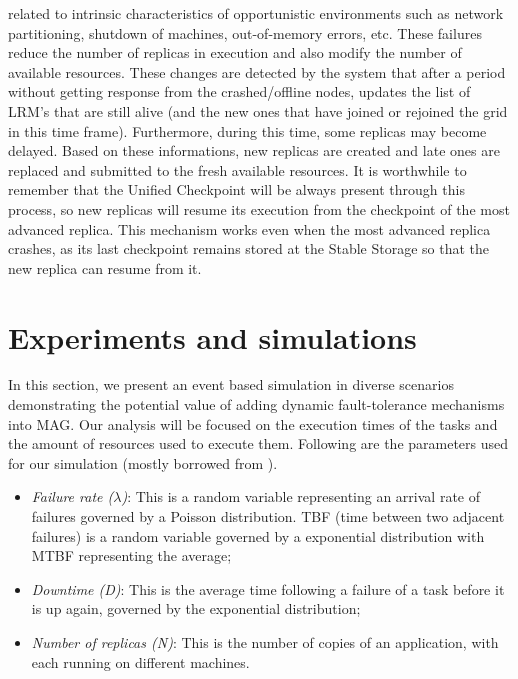 \documentclass[times, 09pt, twocolumn]{article}
\begin{document}
related to intrinsic characteristics of opportunistic environments such as
network partitioning, shutdown of machines, out-of-memory errors, etc. These
failures reduce the number of replicas in execution and also modify the number
of available resources. These changes are detected by the system that after a
period without getting response from the crashed/offline nodes, updates the
list of LRM's that are still alive (and the new ones that have joined or
rejoined the grid in this time frame). Furthermore, during this time, some
replicas may become delayed. Based on these informations, new replicas are
created and late ones are replaced and submitted to the fresh available
resources. It is worthwhile to remember that the Unified Checkpoint will be
always present through this process, so new replicas will resume its execution
from the checkpoint of the most advanced replica. This mechanism works even
when the most advanced replica crashes, as its last checkpoint remains stored
at the Stable Storage so that the new replica can resume from it.

%

\section{Experiments and simulations}\label{sec:eval}

In this section, we present an event based simulation in diverse scenarios
demonstrating the potential value of adding dynamic fault-tolerance mechanisms
into MAG. Our analysis will be focused on the execution times of the tasks and
the amount of resources used to execute them. Following are the parameters used
for our simulation (mostly borrowed from \cite{plank98, beguelin97}).

\begin{itemize}
    \item \emph{Failure rate ($\lambda$)}: This is a random variable
representing an arrival rate of failures governed by a Poisson distribution.
TBF (time between two adjacent failures) is a random variable governed by a
exponential distribution with MTBF representing the average;
    
    \item \emph{Downtime (D)}: This is the average time following a failure of a
task before it is up again, governed by the exponential distribution;
   
    \item \emph{Number of replicas (N)}: This is the number of copies of an
application, with each running on different machines.  \end{itemize}
\end{document}
